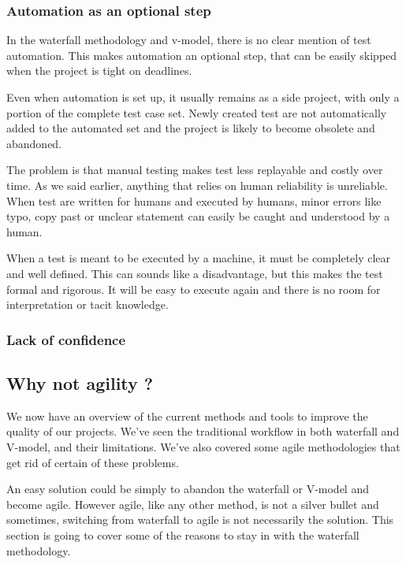 \subsubsection{Automation as an optional step}
In the waterfall methodology and v-model, there is no clear mention of test
automation.
This makes automation an optional step, that can be easily skipped when the
project is tight on deadlines.

Even when automation is set up, it usually remains as a side project, with
only a portion of the complete test case set.
Newly created test are not automatically added to the automated set and the
project is likely to become obsolete and abandoned.

The problem is that manual testing makes test less replayable and costly over
time.
As we said earlier, anything that relies on human reliability is unreliable.
When test are written for humans and executed by humans, minor errors like
typo, copy past or unclear statement can easily be caught and
understood by a human.

When a test is meant to be executed by a machine, it must be completely clear
and well defined.
This can sounds like a disadvantage, but this makes the test formal and
rigorous.
It will be easy to execute again and there is no room for interpretation or
tacit knowledge.

\subsubsection{Lack of confidence}


\subsection{Why not agility ?}\label{subsec:whby-not-agility}


We now have an overview of the current methods and tools to improve the
quality of our projects.
We've seen the traditional workflow in both waterfall and V-model, and their
limitations.
We've also covered some agile methodologies that get rid of certain of these
problems.

An easy solution could be simply to abandon the waterfall or V-model and become
agile.
However agile, like any other method, is not a silver bullet and sometimes,
switching from waterfall to agile is not necessarily the solution.
This section is going to cover some of the reasons to stay in with the
waterfall methodology.

